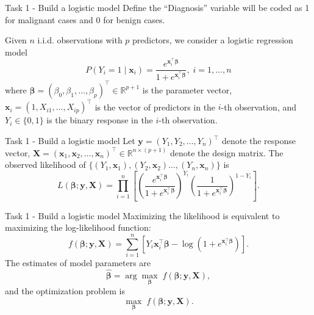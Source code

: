 \documentclass[
  ignorenonframetext,
]{beamer}
\begin{document}
\begin{frame}{Task 1 - Build a logistic model}
\protect\hypertarget{task-1---build-a-logistic-model}{}
Define the ``Diagnosis'' variable will be coded as 1 for malignant cases
and 0 for benign cases.

\par

Given \(n\) i.i.d. observations with \(p\) predictors, we consider a
logistic regression model \begin{equation}\label{model}
P(Y_i=1\mid \mathbf{x}_i)=\frac{e^{\mathbf{x}_i^\top\boldsymbol{\beta}}}{1+e^{\mathbf{x}_i^\top\boldsymbol{\beta}}},\; i=1,\ldots,n
\end{equation} where
\(\boldsymbol{\beta}=(\beta_0,\beta_1,\ldots,\beta_p)^\top\in\mathbb{R}^{p+1}\)
is the parameter vector, \(\mathbf{x}_i=(1,X_{i1},\ldots,X_{ip})^\top\)
is the vector of predictors in the \(i\)-th observation, and
\(Y_i\in\{0,1\}\) is the binary response in the \(i\)-th observation.
\end{frame}

\begin{frame}{Task 1 - Build a logistic model}
\protect\hypertarget{task-1---build-a-logistic-model-1}{}
Let \(\mathbf{y}=(Y_1,Y_2,\ldots,Y_n)^\top\) denote the response vector,
\(\mathbf{X}=(\mathbf{x}_1,\mathbf{x}_2,\ldots,\mathbf{x}_n)^\top\in\mathbb{R}^{n\times(p+1)}\)
denote the design matrix. The observed likelihood of
\(\{(Y_1,\mathbf{x}_1),(Y_2,\mathbf{x}_2)\ldots,(Y_n,\mathbf{x}_n)\}\)
is
\[L(\boldsymbol{\beta};\mathbf{y},\mathbf{X})=\prod_{i=1}^n\left[\left(\frac{e^{\mathbf{x}_i^\top\boldsymbol{\beta}}}{1+e^{\mathbf{x}_i^\top\boldsymbol{\beta}}}\right)^{Y_i}\left(\frac{1}{1+e^{\mathbf{x}_i^\top\boldsymbol{\beta}}}\right)^{1-Y_i}\right].\]
\end{frame}

\begin{frame}{Task 1 - Build a logistic model}
\protect\hypertarget{task-1---build-a-logistic-model-2}{}
Maximizing the likelihood is equivalent to maximizing the log-likelihood
function: \begin{equation}\label{func}
f(\boldsymbol{\beta};\mathbf{y},\mathbf{X})=\sum_{i=1}^n\left[Y_i\mathbf{x}_i^\top\boldsymbol{\beta}-\log\left(1+e^{\mathbf{x}_i^\top\boldsymbol{\beta}}\right)\right].
\end{equation} The estimates of model parameters are
\[\widehat{\boldsymbol{\beta}}=\arg\max_{\boldsymbol{\beta}}\; f(\boldsymbol{\beta};\mathbf{y},\mathbf{X}),\]
and the optimization problem is \begin{equation}\label{opt}
\max_{\boldsymbol{\beta}}\; f(\boldsymbol{\beta};\mathbf{y},\mathbf{X}).
\end{equation}
\end{frame}
\end{document}
